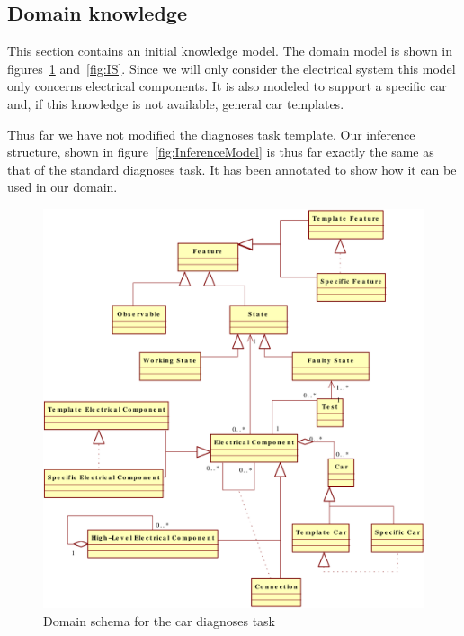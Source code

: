 \documentclass[a4paper,10pt]{article}
\begin{document}
\subsection{Domain knowledge}
This section contains an initial knowledge model. The domain model is shown in figures~\ref{fig:DS} and~\ref{fig:IS}. Since we will only consider the electrical system this model only concerns electrical components. It is also modeled to support a specific car and, if this knowledge is not available, general car templates.

Thus far we have not modified the diagnoses task template. Our inference structure, shown in figure~\ref{fig:InferenceModel} is thus far exactly the same as that of the standard diagnoses task. It has been annotated to show how it can be used in our domain.


\begin{figure}[htbp]
	\centering
		\includegraphics[width=1.00\textwidth]{domainSchema.pdf}
	\caption{Domain schema for the car diagnoses task}
	\label{fig:DS}
\end{figure}
\end{document}
